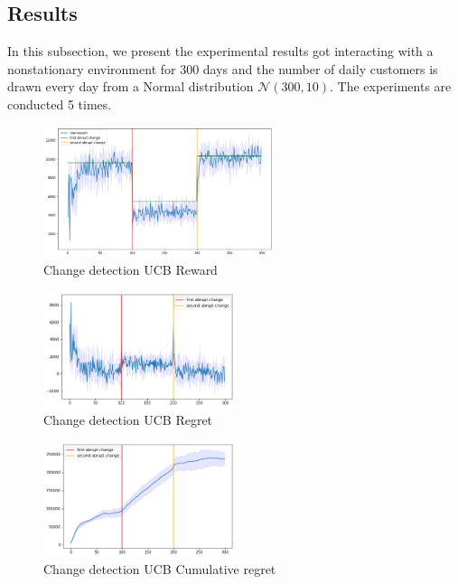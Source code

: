 \subsection{Results}
In this subsection, we present the experimental results got interacting with a nonstationary environment for 300 days and the number of daily customers is drawn every day from a Normal distribution $\mathcal{N}(300, 10)$. The experiments are conducted 5 times.
\begin{figure}[ht]
    \begin{center}
    \includegraphics[width=0.6\textwidth]{img/rewards_active2.png}
    \caption{Change detection UCB Reward}
    \label{fig:reward61}
    \end{center}
\end{figure}
\begin{multicols}{2}
    \begin{figure}[H]
        \begin{center}
        \includegraphics[width=0.5\textwidth]{img/regret_active2.png}
        \caption{Change detection UCB Regret}
        \label{fig:regret61}
        \end{center}
    \end{figure}
    \columnbreak
    \begin{figure}[H]
        \begin{center}
        \includegraphics[width=0.5\textwidth]{img/cumulative_regret_active2.png}
        \caption{Change detection UCB Cumulative regret}
        \label{fig:cum_reg61}
        \end{center}
    \end{figure}
\end{multicols}

